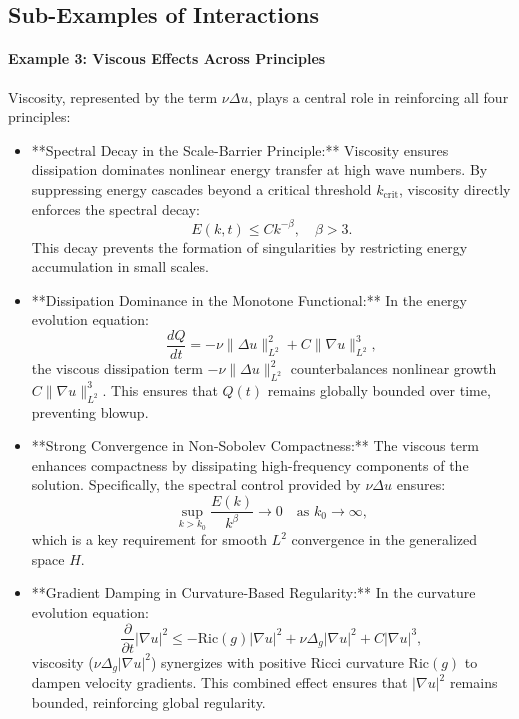 \subsection{Sub-Examples of Interactions}

\paragraph{Example 3: Viscous Effects Across Principles}
Viscosity, represented by the term $\nu \Delta u$, plays a central role in reinforcing all four principles:
\begin{itemize}
    \item **Spectral Decay in the Scale-Barrier Principle:**
    Viscosity ensures dissipation dominates nonlinear energy transfer at high wave numbers. By suppressing energy cascades beyond a critical threshold $k_{\text{crit}}$, viscosity directly enforces the spectral decay:
    \begin{equation}
    E(k, t) \leq C k^{-\beta}, \quad \beta > 3.
    \end{equation}
    This decay prevents the formation of singularities by restricting energy accumulation in small scales.

    \item **Dissipation Dominance in the Monotone Functional:**
    In the energy evolution equation:
    \begin{equation}
    \frac{dQ}{dt} = -\nu \|\Delta u\|_{L^2}^2 + C \|\nabla u\|_{L^2}^3,
    \end{equation}
    the viscous dissipation term $-\nu \|\Delta u\|_{L^2}^2$ counterbalances nonlinear growth $C \|\nabla u\|_{L^2}^3$. This ensures that $Q(t)$ remains globally bounded over time, preventing blowup.

    \item **Strong Convergence in Non-Sobolev Compactness:**
    The viscous term enhances compactness by dissipating high-frequency components of the solution. Specifically, the spectral control provided by $\nu \Delta u$ ensures:
    \begin{equation}
    \sup_{k > k_0} \frac{E(k)}{k^\beta} \to 0 \quad \text{as } k_0 \to \infty,
    \end{equation}
    which is a key requirement for smooth $L^2$ convergence in the generalized space $H$.

    \item **Gradient Damping in Curvature-Based Regularity:**
    In the curvature evolution equation:
    \begin{equation}
    \frac{\partial}{\partial t} |\nabla u|^2 \leq -\text{Ric}(g)|\nabla u|^2 + \nu \Delta_g |\nabla u|^2 + C|\nabla u|^3,
    \end{equation}
    viscosity ($\nu \Delta_g |\nabla u|^2$) synergizes with positive Ricci curvature $\text{Ric}(g)$ to dampen velocity gradients. This combined effect ensures that $|\nabla u|^2$ remains bounded, reinforcing global regularity.
\end{itemize}


